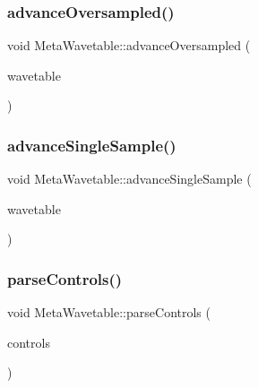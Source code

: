 \mbox{\label{class_meta_wavetable_a7fcebc48f6a36942178e2cc787c9fd62}} 
\subsubsection{\texorpdfstring{advance\+Oversampled()}{advanceOversampled()}}
{\footnotesize\ttfamily void Meta\+Wavetable\+::advance\+Oversampled (\begin{DoxyParamCaption}\item[{uint32\+\_\+t $\ast$}]{wavetable }\end{DoxyParamCaption})}

\mbox{\label{class_meta_wavetable_a63b97b4f3c1dcfbefe9cd64e4f4ebdd9}} 
\subsubsection{\texorpdfstring{advance\+Single\+Sample()}{advanceSingleSample()}}
{\footnotesize\ttfamily void Meta\+Wavetable\+::advance\+Single\+Sample (\begin{DoxyParamCaption}\item[{uint32\+\_\+t $\ast$}]{wavetable }\end{DoxyParamCaption})}

\mbox{\label{class_meta_wavetable_aef9e49472a0090846830c119098e5351}} 
\subsubsection{\texorpdfstring{parse\+Controls()}{parseControls()}}
{\footnotesize\ttfamily void Meta\+Wavetable\+::parse\+Controls (\begin{DoxyParamCaption}\item[{\mbox{\hyperlink{class_via_controls}{Via\+Controls}} $\ast$}]{controls }\end{DoxyParamCaption})}



